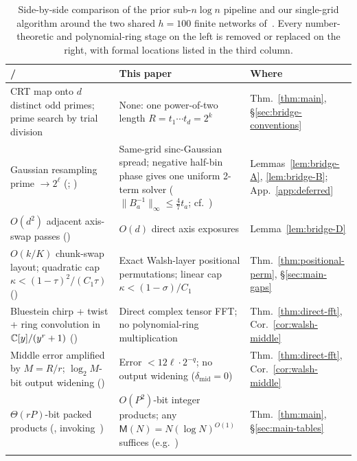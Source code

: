 \begin{table}[!ht]
\setlength{\abovecaptionskip}{2pt}
\setlength{\belowcaptionskip}{3pt}
\centering
\footnotesize
\caption{Side-by-side comparison of the prior sub-$n\log n$ pipeline and our single-grid algorithm around the two shared $h=100$ finite networks of~\cite{OAI26}. Every number-theoretic and polynomial-ring stage on the left is removed or replaced on the right, with formal locations listed in the third column.}
\label{tab:components}
\setlength{\tabcolsep}{3.5pt}
\begin{tabular}{@{}>{\raggedright}p{}>{\raggedright}p{}>{\raggedright\arraybackslash}p{}@{}}
\toprule
\cite{HvdH21} / \cite{OAI26} & This paper & Where \\
\midrule
CRT map onto $d$ distinct odd primes; prime search by trial division & None: one power-of-two length $R=t_1\cdots t_d=2^k$ & Thm.~\ref{thm:main}, \S\ref{sec:bridge-conventions} \\\addlinespace[1pt]
Gaussian resampling prime $\to 2^\ell$ (\cite{HvdH21}; \cite[Lemmas~19--20]{OAI26}) & Same-grid sinc-Gaussian spread; negative half-bin phase gives one uniform 2-term solver ($\|B_a^{-1}\|_\infty\le\frac47 t_a$; cf.~\cite{MS}) & Lemmas~\ref{lem:bridge-A}, \ref{lem:bridge-B}; App.~\ref{app:deferred} \\\addlinespace[1pt]
$O(d^2)$ adjacent axis-swap passes (\cite[\S9]{OAI26}) & $O(d)$ direct axis exposures & Lemma~\ref{lem:bridge-D} \\\addlinespace[1pt]
$O(k/K)$ chunk-swap layout; quadratic cap $\kappa<(1-\tau)^2/(C_1\tau)$ (\cite[Lemma~16]{OAI26}) & Exact Walsh-layer positional permutations; linear cap $\kappa<(1-\sigma)/C_1$ & Thm.~\ref{thm:positional-perm}, \S\ref{sec:main-gaps} \\\addlinespace[1pt]
Bluestein chirp + twist + ring convolution in $\mathbb{C}[y]/(y^r+1)$ (\cite[Prop.~18, Lemma~21]{OAI26}) & Direct complex tensor FFT; no polynomial-ring multiplication & Thm.~\ref{thm:direct-fft}, Cor.~\ref{cor:walsh-middle} \\\addlinespace[1pt]
Middle error amplified by $M=R/r$; $\log_2 M$-bit output widening (\cite[Prop.~18]{OAI26}) & Error $<12\ell\cdot 2^{-q}$; no output widening ($\delta_{\mathrm{mid}}=0$) & Thm.~\ref{thm:direct-fft}, Cor.~\ref{cor:walsh-middle} \\\addlinespace[1pt]
$\Theta(rP)$-bit packed products (\cite[Lemma~17]{OAI26}, invoking~\cite{HvdH21}) & $O(P^2)$-bit integer products; any $\mathsf M(N)=N(\log N)^{O(1)}$ suffices (e.g.~\cite{SS71}) & Thm.~\ref{thm:main}, \S\ref{sec:main-tables} \\\addlinespace[1pt]

\end{tabular}
\end{table}
